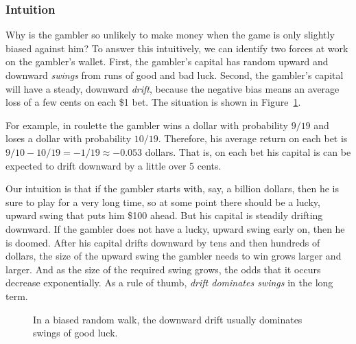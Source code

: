 \subsubsection{Intuition}

Why is the gambler so unlikely to make money when the game is only
slightly biased against him?  To answer this intuitively, we can
identify two forces at work on the gambler's wallet.  First, the
gambler's capital has random upward and downward \emph{swings} from
runs of good and bad luck.  Second, the gambler's capital will have a
steady, downward \emph{drift}, because the negative bias means an
average loss of a few cents on each \$1 bet.  The situation is shown
in Figure~\ref{fig:19P3}.

\begin{editingnotes}

For example, in roulette the gambler wins a dollar with probability $9/19$
and loses a dollar with probability $10/19$.  Therefore, his average
return on each bet is $9/10 - 10/19 = - 1/19 \approx -0.053$ dollars.
That is, on each bet his capital is can be expected to drift downward by a
little over 5 cents.

\end{editingnotes}

Our intuition is that if the gambler starts with, say, a billion
dollars, then he is sure to play for a very long time, so at some
point there should be a lucky, upward swing that puts him \$100 ahead.
But his capital is steadily drifting downward.  If the gambler does
not have a lucky, upward swing early on, then he is doomed.  After his
capital drifts downward by tens and then hundreds of dollars, the size
of the upward swing the gambler needs to win grows larger and larger.
And as the size of the required swing grows, the odds that it occurs
decrease exponentially.  As a rule of thumb, \emph{drift dominates
  swings} in the long term.

\begin{figure}[h]


\caption{In a biased random walk, the downward drift usually dominates
  swings of good luck.}

\label{fig:19P3}

\end{figure}

\iffalse
\begin{figure}
\centerline{\texttt{[image: walk2]}}
\caption{\em In an unfair game, the gambler's capital swings randomly up
and down, but steadily drifts downward.  If the gambler does not have
a winning swing early on, then his capital drifts downward, and later
upward swings are insufficient to make him a winner.}
\label{LN12:fig:walk2}
\end{figure}
\fi

